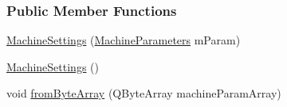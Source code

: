 \subsubsection*{Public Member Functions}
\begin{DoxyCompactItemize}
\item 
\mbox{\hyperlink{classMachineSettings_ab1b5f2057a07bb5bf20931cd9d5afb25}{Machine\+Settings}} (\mbox{\hyperlink{classMachineSettings_a87879e13793dbc7c10d4fa18e1236751}{Machine\+Parameters}} m\+Param)
\item 
\mbox{\hyperlink{classMachineSettings_a6ecb0fe6e75f5c33941cb08d467e834f}{Machine\+Settings}} ()
\item 
void \mbox{\hyperlink{classMachineSettings_ac28b9c28855fe22c85e95379eea9c252}{from\+Byte\+Array}} (Q\+Byte\+Array machine\+Param\+Array)
\end{DoxyCompactItemize}
